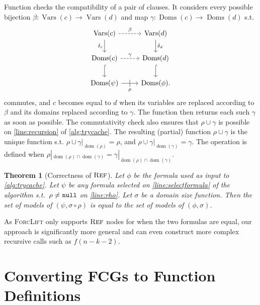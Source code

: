 \documentclass{article}
\newtheorem{theorem}{Theorem}
\newcommand{\nulll}{\texttt{\textup{null}}}
\DeclareMathOperator{\Reff}{\textsc{Ref}}
\DeclareMathOperator{\dom}{dom}
\DeclareMathOperator{\Doms}{Doms}
\DeclareMathOperator{\Vars}{Vars}
\begin{document}
Function \generateMaps checks the compatibility of a pair of clauses. It
considers every possible bijection $\beta\colon \Vars(c) \to \Vars(d)$ and map
$\gamma\colon \Doms(c) \to \Doms(d)$ s.t.
\[
  \begin{tikzcd}
    \Vars(c) \ar[r, dashed, "\beta"] \arrow[d, swap, "\delta_c"] & \Vars(d) \ar[d, "\delta_d"] \\
    \Doms(c) \ar[r, dashed, "\gamma"] \ar[d, hookrightarrow] & \Doms(d) \ar[d, hookrightarrow] \\
    \Doms(\psi) \ar[r, swap, "\rho", "|" marking, outer sep=5pt] & \Doms(\phi).
  \end{tikzcd}
\]
commutes, and $c$ becomes equal to $d$ when its variables are replaced according
to $\beta$ and its domains replaced according to $\gamma$. The function then
returns each such $\gamma$ as soon as possible. The commutativity check also
ensures that $\rho \cup \gamma$ is possible on \cref{line:recursion} of
\cref{alg:trycache}. The resulting (partial) function $\rho \cup \gamma$ is the
unique function s.t. $\rho \cup \gamma|_{\dom(\rho)} = \rho$, and
$\rho \cup \gamma|_{\dom(\gamma)} = \gamma$. The operation is defined when
$\rho|_{\dom(\rho)\cap\dom(\gamma)} = \gamma|_{\dom(\rho)\cap\dom(\gamma)}$.

\begin{theorem}[Correctness of $\Reff$]
  Let $\phi$ be the formula used as input to \cref{alg:trycache}. Let $\psi$ be
  any formula selected on \cref{line:selectformula} of the algorithm s.t.\
  $\rho \ne \nulll$ on \cref{line:rho}. Let $\sigma$ be a domain size function.
  Then the set of models of $(\psi, \sigma \circ \rho)$ is equal to the set of
  models of $(\phi, \sigma)$.
\end{theorem}

As \textsc{ForcLift} only supports $\Reff$ nodes for when the two formulas are
equal, our approach is significantly more general and can even construct more
complex recursive calls such as $f(n-k-2)$.

\section{Converting FCGs to Function Definitions}\label{sec:interpret}
\end{document}

